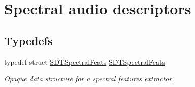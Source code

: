 \hypertarget{group__spectralfeats}{}\section{Spectral audio descriptors}
\label{group__spectralfeats}
\subsection*{Typedefs}
\begin{DoxyCompactItemize}
\item 
\hypertarget{group__spectralfeats_ga92a20692ab1920ebf580c87a45285d4b}{}typedef struct \hyperlink{group__spectralfeats_ga92a20692ab1920ebf580c87a45285d4b}{S\+D\+T\+Spectral\+Feats} \hyperlink{group__spectralfeats_ga92a20692ab1920ebf580c87a45285d4b}{S\+D\+T\+Spectral\+Feats}\label{group__spectralfeats_ga92a20692ab1920ebf580c87a45285d4b}

\begin{DoxyCompactList}\small\item\em Opaque data structure for a spectral features extractor. \end{DoxyCompactList}\end{DoxyCompactItemize}
